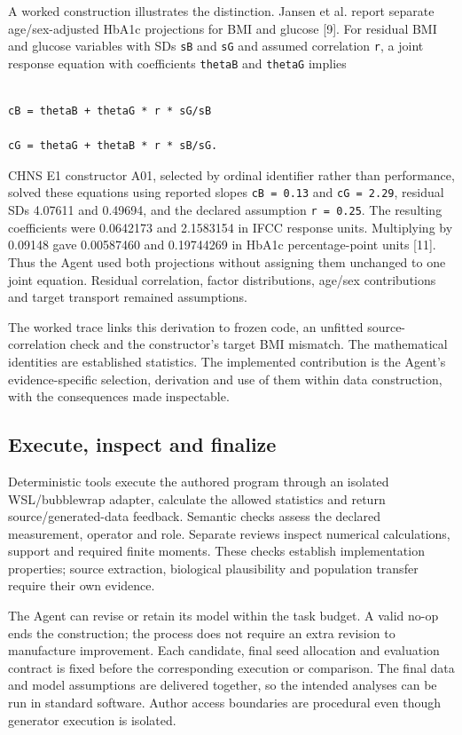 \documentclass[10pt,twocolumn]{article}
\begin{document}
A worked construction illustrates the distinction. Jansen et al. report separate age/sex-adjusted HbA1c projections for BMI and glucose [9]. For residual BMI and glucose variables with SDs \texttt{sB} and \texttt{sG} and assumed correlation \texttt{r}, a joint response equation with coefficients \texttt{thetaB} and \texttt{thetaG} implies


\begin{lstlisting}

cB = thetaB + thetaG * r * sG/sB

cG = thetaG + thetaB * r * sB/sG.

\end{lstlisting}

CHNS E1 constructor A01, selected by ordinal identifier rather than performance, solved these equations using reported slopes \texttt{cB = 0.13} and \texttt{cG = 2.29}, residual SDs 4.07611 and 0.49694, and the declared assumption \texttt{r = 0.25}. The resulting coefficients were 0.0642173 and 2.1583154 in IFCC response units. Multiplying by 0.09148 gave 0.00587460 and 0.19744269 in HbA1c percentage-point units [11]. Thus the Agent used both projections without assigning them unchanged to one joint equation. Residual correlation, factor distributions, age/sex contributions and target transport remained assumptions.


The worked trace links this derivation to frozen code, an unfitted source-correlation check and the constructor's target BMI mismatch. The mathematical identities are established statistics. The implemented contribution is the Agent's evidence-specific selection, derivation and use of them within data construction, with the consequences made inspectable.


\subsection{Execute, inspect and finalize}

Deterministic tools execute the authored program through an isolated WSL/bubblewrap adapter, calculate the allowed statistics and return source/generated-data feedback. Semantic checks assess the declared measurement, operator and role. Separate reviews inspect numerical calculations, support and required finite moments. These checks establish implementation properties; source extraction, biological plausibility and population transfer require their own evidence.


The Agent can revise or retain its model within the task budget. A valid no-op ends the construction; the process does not require an extra revision to manufacture improvement. Each candidate, final seed allocation and evaluation contract is fixed before the corresponding execution or comparison. The final data and model assumptions are delivered together, so the intended analyses can be run in standard software. Author access boundaries are procedural even though generator execution is isolated.
\end{document}
